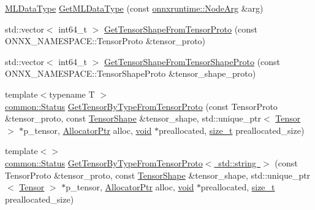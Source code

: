 \begin{DoxyCompactItemize}
\item 
\mbox{\hyperlink{namespaceonnxruntime_ad77d0a6e838ec7da5dc35fed5ee66b49}{M\+L\+Data\+Type}} \mbox{\hyperlink{namespaceonnxruntime_1_1utils_ab22ac0ad2ec6d6529d6bacc19f7d7093}{Get\+M\+L\+Data\+Type}} (const \mbox{\hyperlink{classonnxruntime_1_1NodeArg}{onnxruntime\+::\+Node\+Arg}} \&arg)
\item 
std\+::vector$<$ int64\+\_\+t $>$ \mbox{\hyperlink{namespaceonnxruntime_1_1utils_a058a261f33e28422b7563ae84f71f55b}{Get\+Tensor\+Shape\+From\+Tensor\+Proto}} (const O\+N\+N\+X\+\_\+\+N\+A\+M\+E\+S\+P\+A\+C\+E\+::\+Tensor\+Proto \&tensor\+\_\+proto)
\item 
std\+::vector$<$ int64\+\_\+t $>$ \mbox{\hyperlink{namespaceonnxruntime_1_1utils_aa06bea787e7bab1d7a773107fa1f8862}{Get\+Tensor\+Shape\+From\+Tensor\+Shape\+Proto}} (const O\+N\+N\+X\+\_\+\+N\+A\+M\+E\+S\+P\+A\+C\+E\+::\+Tensor\+Shape\+Proto \&tensor\+\_\+shape\+\_\+proto)
\item 
{\footnotesize template$<$typename T $>$ }\\\mbox{\hyperlink{classonnxruntime_1_1common_1_1Status}{common\+::\+Status}} \mbox{\hyperlink{namespaceonnxruntime_1_1utils_a4b262f6da83860e920ce90279a3fb400}{Get\+Tensor\+By\+Type\+From\+Tensor\+Proto}} (const Tensor\+Proto \&tensor\+\_\+proto, const \mbox{\hyperlink{classonnxruntime_1_1TensorShape}{Tensor\+Shape}} \&tensor\+\_\+shape, std\+::unique\+\_\+ptr$<$ \mbox{\hyperlink{classonnxruntime_1_1Tensor}{Tensor}} $>$ $\ast$p\+\_\+tensor, \mbox{\hyperlink{namespaceonnxruntime_a6cdac724c5dcefded3a63f08dae58fda}{Allocator\+Ptr}} alloc, \mbox{\hyperlink{mlasi_8h_a88f941d423cb2a819b70a1358982b1a6}{void}} $\ast$preallocated, \mbox{\hyperlink{mlasi_8h_a503efbc1c6e50825320ad909366b78ab}{size\+\_\+t}} preallocated\+\_\+size)
\item 
{\footnotesize template$<$$>$ }\\\mbox{\hyperlink{classonnxruntime_1_1common_1_1Status}{common\+::\+Status}} \mbox{\hyperlink{namespaceonnxruntime_1_1utils_a732845e9a1ac398d4fd4d8968e3ebc1e}{Get\+Tensor\+By\+Type\+From\+Tensor\+Proto$<$ std\+::string $>$}} (const Tensor\+Proto \&tensor\+\_\+proto, const \mbox{\hyperlink{classonnxruntime_1_1TensorShape}{Tensor\+Shape}} \&tensor\+\_\+shape, std\+::unique\+\_\+ptr$<$ \mbox{\hyperlink{classonnxruntime_1_1Tensor}{Tensor}} $>$ $\ast$p\+\_\+tensor, \mbox{\hyperlink{namespaceonnxruntime_a6cdac724c5dcefded3a63f08dae58fda}{Allocator\+Ptr}} alloc, \mbox{\hyperlink{mlasi_8h_a88f941d423cb2a819b70a1358982b1a6}{void}} $\ast$preallocated, \mbox{\hyperlink{mlasi_8h_a503efbc1c6e50825320ad909366b78ab}{size\+\_\+t}} preallocated\+\_\+size)

\end{DoxyCompactItemize}

